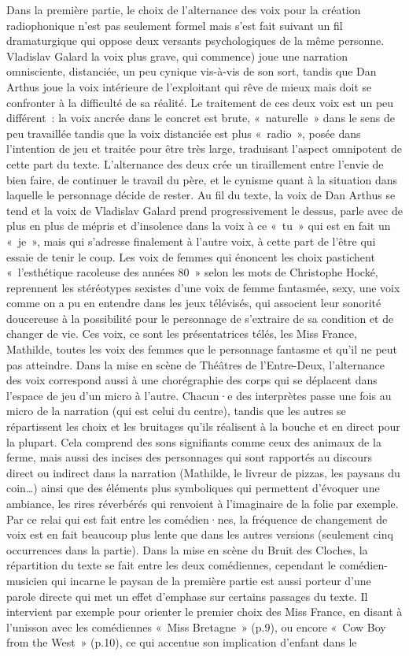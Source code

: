 \documentclass[
]{article}
\begin{document}
Dans la première partie, le choix de l'alternance des voix pour la création radiophonique n'est pas seulement formel mais s'est fait suivant un fil dramaturgique qui oppose deux versants psychologiques de la même personne. Vladislav Galard la voix plus grave, qui commence) joue une narration omnisciente, distanciée, un peu cynique vis-à-vis de son sort, tandis que Dan Arthus joue la voix intérieure de l'exploitant qui rêve de mieux mais doit se confronter à la difficulté de sa réalité. Le traitement de ces deux voix est un peu différent~: la voix ancrée dans le concret est brute, «~naturelle~» dans le sens de peu travaillée tandis que la voix distanciée est plus «~radio~», posée dans l'intention de jeu et traitée pour être très large, traduisant l'aspect omnipotent de cette part du texte. L'alternance des deux crée un tiraillement entre l'envie de bien faire, de continuer le travail du père, et le cynisme quant à la situation dans laquelle le personnage décide de rester. Au fil du texte, la voix de Dan Arthus se tend et la voix de Vladislav Galard prend progressivement le dessus, parle avec de plus en plus de mépris et d'insolence dans la voix à ce «~tu~» qui est en fait un «~je~», mais qui s'adresse finalement à l'autre voix, à cette part de l'être qui essaie de tenir le coup. Les voix de femmes qui énoncent les choix pastichent «~l'esthétique racoleuse des années 80~» selon les mots de Christophe Hocké, reprennent les stéréotypes sexistes d'une voix de femme fantasmée, sexy, une voix comme on a pu en entendre dans les jeux télévisés, qui associent leur sonorité doucereuse à la possibilité pour le personnage de s'extraire de sa condition et de changer de vie. Ces voix, ce sont les présentatrices télés, les Miss France, Mathilde, toutes les voix des femmes que le personnage fantasme et qu'il ne peut pas atteindre. Dans la mise en scène de Théâtres de l'Entre-Deux, l'alternance des voix correspond aussi à une chorégraphie des corps qui se déplacent dans l'espace de jeu d'un micro à l'autre. Chacun·e des interprètes passe une fois au micro de la narration (qui est celui du centre), tandis que les autres se répartissent les choix et les bruitages qu'ils réalisent à la bouche et en direct pour la plupart. Cela comprend des sons signifiants comme ceux des animaux de la ferme, mais aussi des incises des personnages qui sont rapportés au discours direct ou indirect dans la narration (Mathilde, le livreur de pizzas, les paysans du coin\ldots) ainsi que des éléments plus symboliques qui permettent d'évoquer une ambiance, les rires réverbérés qui renvoient à l'imaginaire de la folie par exemple. Par ce relai qui est fait entre les comédien·nes, la fréquence de changement de voix est en fait beaucoup plus lente que dans les autres versions (seulement cinq occurrences dans la partie). Dans la mise en scène du Bruit des Cloches, la répartition du texte se fait entre les deux comédiennes, cependant le comédien-musicien qui incarne le paysan de la première partie est aussi porteur d'une parole directe qui met un effet d'emphase sur certains passages du texte. Il intervient par exemple pour orienter le premier choix des Miss France, en disant à l'unisson avec les comédiennes «~Miss Bretagne~» (p.9), ou encore «~Cow Boy from the West~» (p.10), ce qui accentue son implication d'enfant dans le 
\end{document}
